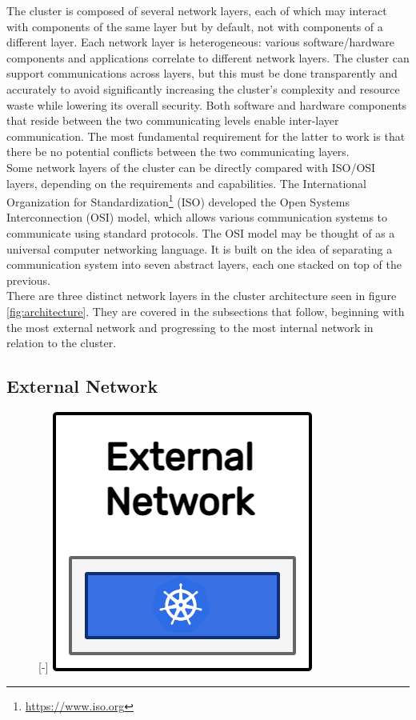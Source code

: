 The cluster is composed of several network layers, each of which may interact
with components of the same layer but by default, not with components of a different
layer. Each network layer is heterogeneous: various software/hardware components
and applications correlate to different network layers. The cluster can support
communications across layers, but this must be done transparently and accurately
to avoid significantly increasing the cluster's complexity and resource waste while
lowering its overall security. Both software and hardware components that reside
between the two communicating levels enable inter-layer communication. The most fundamental
requirement for the latter to work is that there be no potential conflicts between
the two communicating layers. \\ %
Some network layers of the cluster can be directly compared with ISO/OSI layers,
depending on the requirements and capabilities. The International Organization for
Standardization\footnote{\url{https://www.iso.org}} (ISO) developed the Open Systems
Interconnection (OSI) model, which allows various communication systems to
communicate using standard protocols. The OSI model may be thought of as a universal
computer networking language. It is built on the idea of separating a
communication system into seven abstract layers, each one stacked on top of the previous\cite{osi}.
\\ %
There are three distinct network layers in the cluster architecture seen in
figure \ref{fig:architecture}. They are covered in the subsections that follow,
beginning with the most external network and progressing to the most internal
network in relation to the cluster.

\subsection{External Network}
\label{subsec:architecture_network_external_network}

\begin{figure} %
  \raisebox{0pt}[\dimexpr\height-\baselineskip\relax]{\centering
  \includegraphics[width=.2\textwidth]{images/recluster/external_network.png}}
\end{figure}

